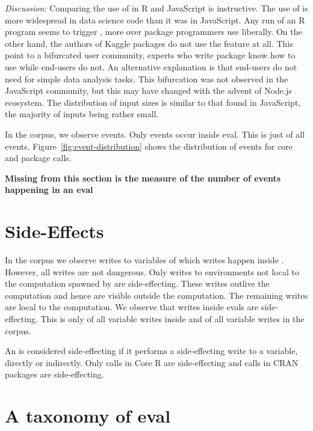 \documentclass[conference]{IEEEtran}
\begin{document}
\medskip\noindent\emph{Discussion:} Comparing the use of \eval in R and
JavaScript is instructive. The use of \eval is more widespread in data
science code than it was in JavaScript. Any run of an R program seems to
trigger \eval, more over package programmers use \eval liberally. On the
other hand, the authors of Kaggle packages do not use the feature at all.
This point to a bifurcated user community, experts who write package know
how to use \eval while end-users do not. An alternative explanation is that
end-users do not need \eval for simple data analysis tasks. This bifurcation
was not observed in the JavaScript community, but this may have changed with
the advent of Node.js ecosystem.  The distribution of input sizes is similar
to that found in JavaScript, the majority of inputs being rather small.


In the corpus, we observe \AllEventCountRnd events. Only \EvalEventCountRnd
events occur inside eval. This is just \EvalEventAllPerc of all events.
Figure~\ref{fig:event-distribution} shows the distribution of events for
core and package \eval calls.

{\bf Missing from this section is the measure of the number of events
  happening in an eval}

\section{Side-Effects}

In the corpus we observe \AllWritesRnd writes to variables of which
\EvalWritesRnd writes happen inside \eval. However, all writes are not
dangerous. Only writes to environments not local to the computation spawned
by \eval are side-effecting. These writes outlive the computation and hence are
visible outside the computation. The remaining writes are local to the
computation. We observe that \EvalSideEffectingWritesRnd writes inside evals are
side-effecting. This is only \EvalSideEffectingWritesEvalPerc of all variable
writes inside \eval and \EvalSideEffectingWritesAllPerc of all variable writes
in the corpus.

An \eval is considered side-effecting if it performs a side-effecting write to a
variable, directly or indirectly. Only \SideEffectingCoreCallPerc \eval calls in
Core R are side-effecting and \SideEffectingPackageCallPerc \eval calls in CRAN
packages are side-effecting.

\section{A taxonomy of eval}
\end{document}
